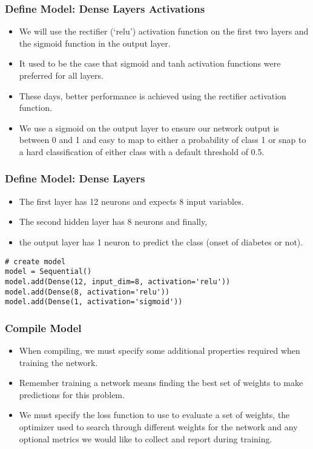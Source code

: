 \begin{frame}[fragile] \frametitle{Define Model: Dense Layers Activations}
 \begin{itemize}
\item  We will use the rectifier (`relu') activation function on the first two layers and the sigmoid function in the output layer.
\item It used to be the case that sigmoid and tanh activation functions were preferred for all layers. 
\item These days, better performance is achieved using the rectifier activation function. 
\item We use a sigmoid on the output layer to ensure our network output is between 0 and 1 and easy to map to either a probability of class 1 or snap to a hard classification of either class with a default threshold of 0.5.
\end{itemize}
\end{frame}


\begin{frame}[fragile] \frametitle{Define Model: Dense Layers}
 \begin{itemize}
\item  The first layer has 12 neurons and expects 8 input variables. 
\item The second hidden layer has 8 neurons and finally,
\item the output layer has 1 neuron to predict the class (onset of diabetes or not).
\end{itemize}
\begin{lstlisting}
# create model
model = Sequential()
model.add(Dense(12, input_dim=8, activation='relu'))
model.add(Dense(8, activation='relu'))
model.add(Dense(1, activation='sigmoid'))
\end{lstlisting}
\end{frame}


\begin{frame}[fragile] \frametitle{Compile Model}
 \begin{itemize}
\item  When compiling, we must specify some additional properties required when training the network. 
\item Remember training a network means finding the best set of weights to make predictions for this problem.
\item We must specify the loss function to use to evaluate a set of weights, the optimizer used to search through different weights for the network and any optional metrics we would like to collect and report during training.
\end{itemize}
\end{frame}

